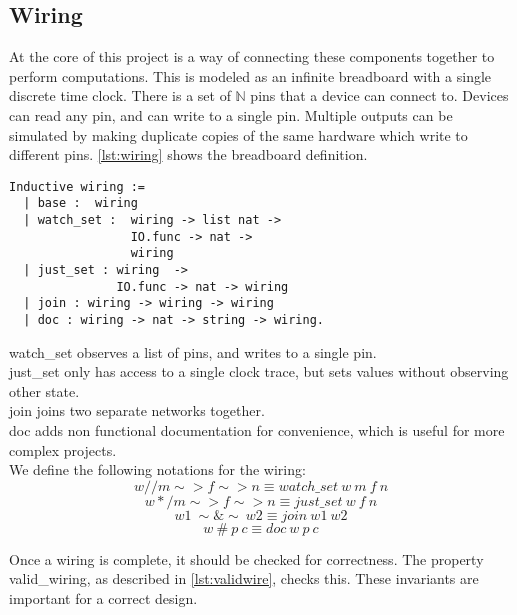 \documentclass[preprint,12pt]{sigplanconf}
\begin{document}
\subsection{Wiring}\label{subsec:wires}
At the core of this project is a way of connecting these components
together to perform computations. This
is modeled as an infinite breadboard with a single discrete time clock. There is a set of
$\mathbb{N}$ pins that a device can connect to. Devices can read any
pin, and can write to a single pin. Multiple outputs can be simulated
by making duplicate copies of the same hardware which write to
different pins. \autoref{lst:wiring} shows the breadboard definition.
\begin{lstlisting}[language=Coq, label={lst:wiring}, caption={wiring
type definition}]
  Inductive wiring :=
  | base :  wiring
  | watch_set :  wiring -> list nat ->
                 IO.func -> nat ->
                 wiring
  | just_set : wiring  -> 
               IO.func -> nat -> wiring
  | join : wiring -> wiring -> wiring
  | doc : wiring -> nat -> string -> wiring.
\end{lstlisting}
watch\_set observes a list of pins, and writes to a single pin.\\
just\_set only has access to a single clock trace, but sets values without observing other state.\\
join joins two separate networks together.\\
doc adds non functional documentation for convenience, which is useful for more complex projects.\\
We define the following notations for the wiring:
\begin{equation}
w //  m \sim> f \sim>  n \equiv watch\_set\ w\ m\ f\ n 
\end{equation}
\begin{equation}
w */  m \sim> f \sim>  n \equiv just\_set\ w\ f\ n 
\end{equation}
\begin{equation}
  w1\ \sim\&\sim\ w2 \equiv join\ w1\ w2
\end{equation}
\begin{equation}
  w\ \#\ p\ c  \equiv doc\ w\ p\ c
\end{equation}


Once a wiring is complete, it should be checked for correctness. The
property valid\_wiring, as described in \autoref{lst:validwire},
checks this. These invariants are important for a correct design.
\end{document}
